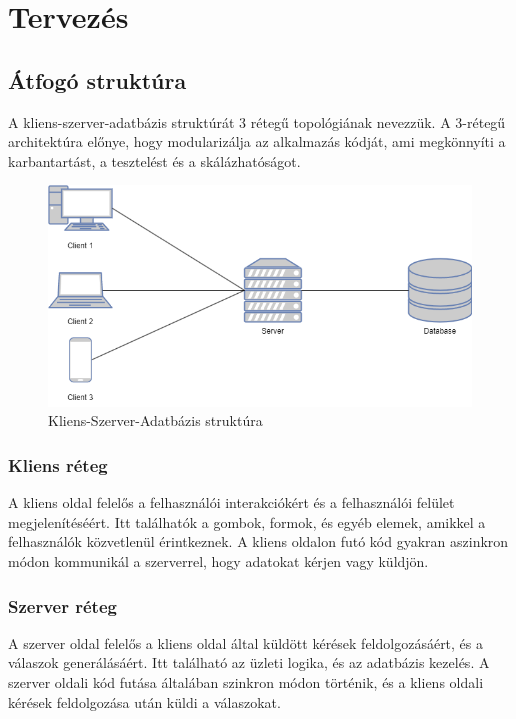 \chapter{Tervez\'es}\label{chapter:tervezes}

\section*{Átfogó struktúra}
A kliens-szerver-adatbázis struktúrát 3 rétegű topológiának nevezzük. A 3-rétegű architektúra előnye, hogy modularizálja az alkalmazás kódját, ami megkönnyíti a karbantartást, a tesztelést és a skálázhatóságot.
\begin{figure}[H]
    \centering
    \includegraphics[width=14.0truecm]{images/Client-Server-DB.png}
    \caption[Kliens-Szerver-Adatbázis struktúra]{Kliens-Szerver-Adatbázis struktúra}
    \label{fig:architecture}
\end{figure}
\subsection*{Kliens réteg}
A kliens oldal felelős a felhasználói interakciókért és a felhasználói felület megjelenítéséért. Itt találhatók a gombok, formok, és egyéb elemek, amikkel a felhasználók közvetlenül érintkeznek. A kliens oldalon futó kód gyakran aszinkron módon kommunikál a szerverrel, hogy adatokat kérjen vagy küldjön.
\\
\subsection*{Szerver réteg}
A szerver oldal felelős a kliens oldal által küldött kérések feldolgozásáért, és a válaszok generálásáért. Itt található az üzleti logika, és az adatbázis kezelés. A szerver oldali kód futása általában szinkron módon történik, és a kliens oldali kérések feldolgozása után küldi a válaszokat.

